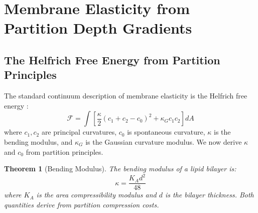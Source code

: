 \documentclass[twocolumn,10pt]{article}
\newtheorem{theorem}{Theorem}[section]
\theoremstyle{remark}
\begin{document}
\section{Membrane Elasticity from Partition Depth Gradients}
\label{sec:elasticity}

\subsection{The Helfrich Free Energy from Partition Principles}

The standard continuum description of membrane elasticity is the Helfrich free energy \cite{helfrich1973}:
\begin{equation}
    \mathcal{F} = \int \left[\frac{\kappa}{2}(c_1 + c_2 - c_0)^2 + \kappa_G c_1 c_2\right] dA
\end{equation}
where $c_1, c_2$ are principal curvatures, $c_0$ is spontaneous curvature, $\kappa$ is the bending modulus, and $\kappa_G$ is the Gaussian curvature modulus. We now derive $\kappa$ and $c_0$ from partition principles.

\begin{theorem}[Bending Modulus]
\label{thm:bending}
The bending modulus of a lipid bilayer is:
\begin{equation}
    \kappa = \frac{K_A d^2}{48}
\end{equation}
where $K_A$ is the area compressibility modulus and $d$ is the bilayer thickness. Both quantities derive from partition compression costs.
\end{theorem}
\end{document}
